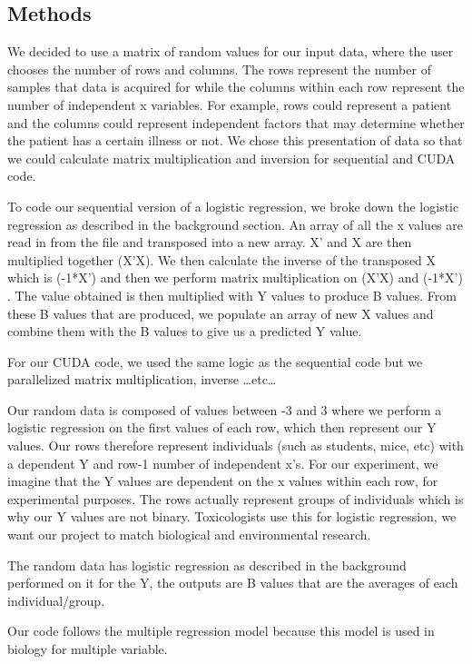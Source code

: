 \documentclass[letterpaper, 10 pt, conference]{ieeeconf}  %
\begin{document}
\subsection{Methods}
We decided to use a matrix of random values for our input data, where the user chooses the number of rows and columns. The rows represent the number of samples that data is acquired for while the columns within each row represent the number of independent x variables. For example, rows could represent a patient and the columns could represent independent factors that may determine whether the patient has a certain illness or not. We chose this presentation of data so that we could calculate matrix multiplication and inversion for sequential and CUDA code. 

To code our sequential version of a logistic regression, we broke down the logistic regression as described in the background section. An array of all the x values are read in from the file and transposed into a new array. X’ and X are then multiplied together (X’X). We then calculate the inverse of the transposed X which is (-1*X') and then we perform matrix multiplication on (X’X) and (-1*X’) . The value obtained is then multiplied with Y values to produce B values. From these B values that are produced, we populate an array of new X values and combine them with the B values to give us a predicted Y value. 

For our CUDA code, we used the same logic as the sequential code but we parallelized  matrix multiplication, inverse …etc…

Our random data is composed of values between -3 and 3 where we perform a logistic regression on the first values of each row, which then represent our Y values. Our rows therefore represent individuals (such as students, mice, etc) with a dependent Y and row-1 number of independent x’s. For our experiment, we imagine that the Y values are dependent on the x values within each row, for experimental purposes. The rows actually represent groups of individuals which is why our Y values are not binary. Toxicologists use this for logistic regression, we want our project to match biological and environmental research. 

The random data has logistic regression as described in the background performed on it for the Y, the outputs are B values that are the averages of each individual/group. 

Our code follows the multiple regression model because this model is used in biology for multiple variable. 
\end{document}
